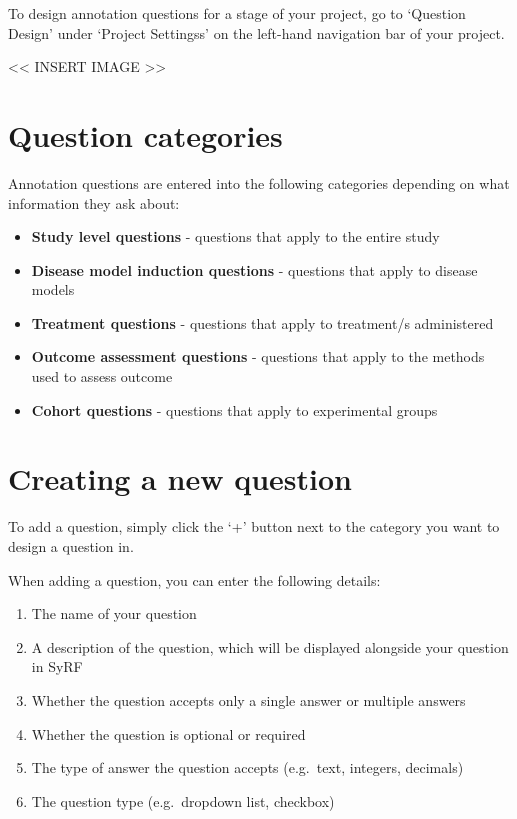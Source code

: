 \documentclass[
]{book}
\providecommand{\tightlist}{%
  \setlength{\itemsep}{0pt}\setlength{\parskip}{0pt}}
\begin{document}
To design annotation questions for a stage of your project, go to `Question Design' under `Project Settingss' on the left-hand navigation bar of your project.

\textless{}\textless{} INSERT IMAGE \textgreater{}\textgreater{}

\hypertarget{question-categories}{%
\section{Question categories}\label{question-categories}}

Annotation questions are entered into the following categories depending on what information they ask about:

\begin{itemize}
\tightlist
\item
  \textbf{Study level questions} - questions that apply to the entire study
\item
  \textbf{Disease model induction questions} - questions that apply to disease models
\item
  \textbf{Treatment questions} - questions that apply to treatment/s administered
\item
  \textbf{Outcome assessment questions} - questions that apply to the methods used to assess outcome
\item
  \textbf{Cohort questions} - questions that apply to experimental groups
\end{itemize}

\hypertarget{creating-a-new-question}{%
\section{Creating a new question}\label{creating-a-new-question}}

To add a question, simply click the `+' button next to the category you want to design a question in.

When adding a question, you can enter the following details:

\begin{enumerate}
\def\labelenumi{\arabic{enumi}.}
\tightlist
\item
  The name of your question
\item
  A description of the question, which will be displayed alongside your question in SyRF
\item
  Whether the question accepts only a single answer or multiple answers
\item
  Whether the question is optional or required
\item
  The type of answer the question accepts (e.g.~text, integers, decimals)
\item
  The question type (e.g.~dropdown list, checkbox)
\end{enumerate}
\end{document}
